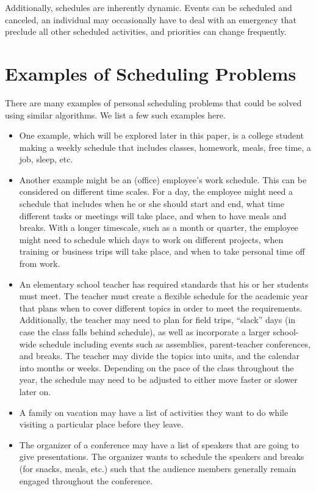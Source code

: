 \documentclass{article}
\newcommand{\todo}[1]{}
\begin{document}
	Additionally, schedules are inherently dynamic.
	Events can be scheduled and canceled, an individual may occasionally have to deal with an emergency that preclude all other scheduled activities, and priorities can change frequently.
	\todo{expand this section}

\section{Examples of Scheduling Problems}
 	There are many examples of personal scheduling problems that could be solved using similar algorithms. We list a few such examples here.
 	\begin{itemize}
 	\item 
		One example, which will be explored later in this paper, is a college student making a weekly schedule that includes classes, homework, meals, free time, a job, sleep, etc.	
 	\item 
	 	Another example might be an (office) employee's work schedule. This can be considered on different time scales. For a day, the employee might need a schedule that includes when he or she should start and end, what time different tasks or meetings will take place, and when to have meals and breaks. With a longer timescale, such as a month or quarter, the employee might need to schedule which days to work on different projects, when training or business trips will take place, and when to take personal time off from work.
 	\item 
	 	An elementary school teacher has required standards that his or her students must meet. The teacher must create a flexible schedule for the academic year that plans when to cover different topics in order to meet the requirements. Additionally, the teacher may need to plan for field trips, ``slack'' days (in case the class falls behind schedule), as well as incorporate a larger school-wide schedule including events such as assemblies, parent-teacher conferences, and breaks. The teacher may divide the topics into units, and the calendar into months or weeks. Depending on the pace of the class throughout the year, the schedule may need to be adjusted to either move faster or slower later on.
 	\item
	 	A family on vacation may have a list of activities they want to do while visiting a particular place before they leave.
	\item
	 	The organizer of a conference may have a list of speakers that are going to give presentations. The organizer wants to schedule the speakers and breaks (for snacks, meals, etc.) such that the audience members generally remain engaged throughout the conference.

\end{itemize}
\end{document}
